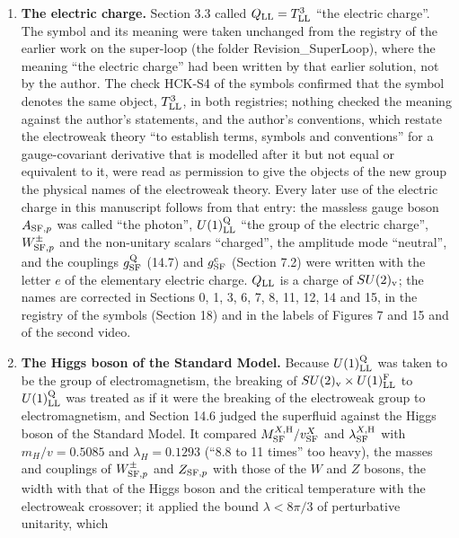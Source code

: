 \documentclass[
  10pt,
]{article}
\providecommand{\tightlist}{%
  \setlength{\itemsep}{0pt}\setlength{\parskip}{0pt}}
\begin{document}
\begin{enumerate}
\def\labelenumi{\arabic{enumi}.}
\tightlist
\item
  \textbf{The electric charge.} Section 3.3 called
  \(Q_{\rm LL}=T^3_{\rm LL}\) ``the electric charge''. The symbol and
  its meaning were taken unchanged from the registry of the earlier work
  on the super-loop (the folder Revision\_SuperLoop), where the meaning
  ``the electric charge'' had been written by that earlier solution, not
  by the author. The check HCK-S4 of the symbols confirmed that the
  symbol denotes the same object, \(T^3_{\rm LL}\), in both registries;
  nothing checked the meaning against the author's statements, and the
  author's conventions, which restate the electroweak theory ``to
  establish terms, symbols and conventions'' for a gauge-covariant
  derivative that is modelled after it but not equal or equivalent to
  it, were read as permission to give the objects of the new group the
  physical names of the electroweak theory. Every later use of the
  electric charge in this manuscript follows from that entry: the
  massless gauge boson \(A_{{\rm SF},p}\) was called ``the photon'',
  \(U(1)^{\rm Q}_{\rm LL}\) ``the group of the electric charge'',
  \(W^\pm_{{\rm SF},p}\) and the non-unitary scalars ``charged'', the
  amplitude mode ``neutral'', and the couplings \(g^{\rm Q}_{\rm SF}\)
  (14.7) and \(g^{\rm c}_{\rm SF}\) (Section 7.2) were written with the
  letter \(e\) of the elementary electric charge. \(Q_{\rm LL}\) is a
  charge of \(SU(2)_{\rm v}\); the names are corrected in Sections 0, 1,
  3, 6, 7, 8, 11, 12, 14 and 15, in the registry of the symbols (Section
  18) and in the labels of Figures 7 and 15 and of the second video.
\item
  \textbf{The Higgs boson of the Standard Model.} Because
  \(U(1)^{\rm Q}_{\rm LL}\) was taken to be the group of
  electromagnetism, the breaking of
  \(SU(2)_{\rm v}\times U(1)^{\rm F}_{\rm LL}\) to
  \(U(1)^{\rm Q}_{\rm LL}\) was treated as if it were the breaking of
  the electroweak group to electromagnetism, and Section 14.6 judged the
  superfluid against the Higgs boson of the Standard Model. It compared
  \(M^{X,{\rm H}}_{\rm SF}/v^X_{\rm SF}\) and
  \(\lambda^{X,{\rm H}}_{\rm SF}\) with \(m_H/v=0.5085\) and
  \(\lambda_H=0.1293\) (``8.8 to 11 times'' too heavy), the masses and
  couplings of \(W^\pm_{{\rm SF},p}\) and \(Z_{{\rm SF},p}\) with those
  of the \(W\) and \(Z\) bosons, the width with that of the Higgs boson
  and the critical temperature with the electroweak crossover; it
  applied the bound \(\lambda<8\pi/3\) of perturbative unitarity, which

\end{enumerate}
\end{document}
